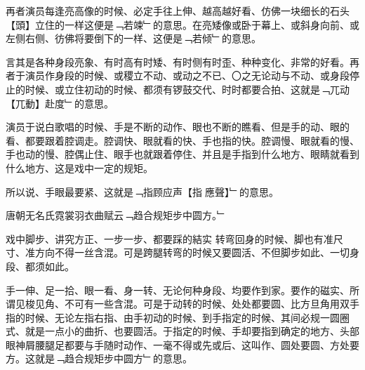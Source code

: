 \documentclass{zhvt-classic}
\begin{document}
再者演员每逢亮高像的时候、必定手往上伸、越高越好看、仿佛一块细长的石头【頭】立住的一样这便是﹁若竦﹂的意思。在亮矮像或卧于幕上、或斜身向前、或左侧右侧、彷佛将要倒下的一样、这便是﹁若倾﹂的意思。

言其是各种身段亮象、有时高有时矮、有时侧有时歪、种种变化、非常的好看。再者于演员作身段的时候、或稷立不动、或动之不已、〇之无论动与不动、或身段停止的时候、或立住初动的时候、都须有锣鼓交代、时时都要合拍、这就是﹁兀动【兀動】赴度﹂的意思。

演员于说白歌唱的时候、手是不断的动作、眼也不断的瞧看、但是手的动、眼的看、都要跟着腔调走。腔调快、眼就看的快、手也指的快。腔调慢、眼就看的慢、手也动的慢、腔偶止住、眼手也就跟着停住、并且是手指到什么地方、眼睛就看到什么地方、这是戏中一定的规矩。

所以说、手眼最要紧、这就是﹁指顾应声【指𮸹應聲】﹂的意思。

\begin{preface}
唐朝无名氏霓裳羽衣曲赋云﹁趋合规矩步中圆方。﹂
\end{preface}

戏中脚步、讲究方正、一步一步、都要踩的結实 转弯回身的时候、脚也有准尺寸、准方向不得一丝含混。可是跨腿转弯的时候又要圆活、不但脚步如此、一切身段、都须如此。

手一伸、足一拾、眼一看、身一转、无论何种身段、均要作到家。要作的磁实、所谓见梭见角、不可有一些含混。可是于动转的时候、处处都要圆、比方旦角用双手指的时候、无论左指右指、由手初动的时候、到手指定的时候、其间必规一圆圈式、就是一点小的曲折、也要圆活。于指定的时候、手却要指到确定的地方、头部眼神屑腰腿足都要与手随时动作、一毫不得或先或后、这叫作、圆处要圆、方处要方。这就是﹁趋合规矩步中圆方﹂的意思。
\end{document}
